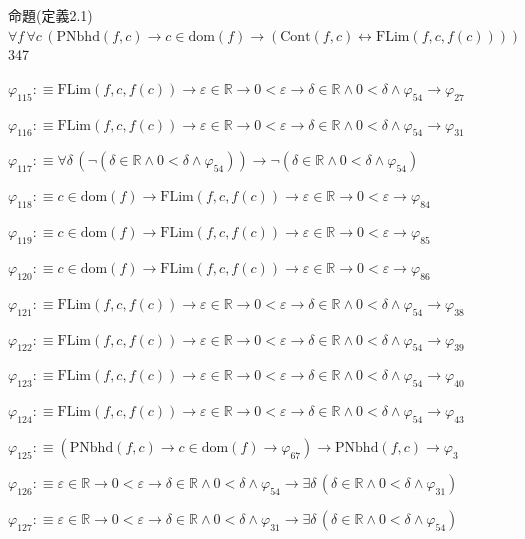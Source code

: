 \begin{fullproof}{命題(定義2.1)}{$\forall f\,\forall c\,(\mathrm{PNbhd}(f,c) \to c \in \mathrm{dom}(f) \to (\mathrm{Cont}(f,c) \leftrightarrow \mathrm{FLim}(f,c,f(c))))$}{347}
\begin{abbrevlist}
\item $\varphi_{115} :\equiv \mathrm{FLim}(f,c,f(c)) \to \varepsilon \in \mathbb{R} \to 0 < \varepsilon \to \delta \in \mathbb{R} \land 0 < \delta \land \varphi_{54} \to \varphi_{27}$
\item $\varphi_{116} :\equiv \mathrm{FLim}(f,c,f(c)) \to \varepsilon \in \mathbb{R} \to 0 < \varepsilon \to \delta \in \mathbb{R} \land 0 < \delta \land \varphi_{54} \to \varphi_{31}$
\item $\varphi_{117} :\equiv \forall \delta\,(\neg (\delta \in \mathbb{R} \land 0 < \delta \land \varphi_{54})) \to \neg (\delta \in \mathbb{R} \land 0 < \delta \land \varphi_{54})$
\item $\varphi_{118} :\equiv c \in \mathrm{dom}(f) \to \mathrm{FLim}(f,c,f(c)) \to \varepsilon \in \mathbb{R} \to 0 < \varepsilon \to \varphi_{84}$
\item $\varphi_{119} :\equiv c \in \mathrm{dom}(f) \to \mathrm{FLim}(f,c,f(c)) \to \varepsilon \in \mathbb{R} \to 0 < \varepsilon \to \varphi_{85}$
\item $\varphi_{120} :\equiv c \in \mathrm{dom}(f) \to \mathrm{FLim}(f,c,f(c)) \to \varepsilon \in \mathbb{R} \to 0 < \varepsilon \to \varphi_{86}$
\item $\varphi_{121} :\equiv \mathrm{FLim}(f,c,f(c)) \to \varepsilon \in \mathbb{R} \to 0 < \varepsilon \to \delta \in \mathbb{R} \land 0 < \delta \land \varphi_{54} \to \varphi_{38}$
\item $\varphi_{122} :\equiv \mathrm{FLim}(f,c,f(c)) \to \varepsilon \in \mathbb{R} \to 0 < \varepsilon \to \delta \in \mathbb{R} \land 0 < \delta \land \varphi_{54} \to \varphi_{39}$
\item $\varphi_{123} :\equiv \mathrm{FLim}(f,c,f(c)) \to \varepsilon \in \mathbb{R} \to 0 < \varepsilon \to \delta \in \mathbb{R} \land 0 < \delta \land \varphi_{54} \to \varphi_{40}$
\item $\varphi_{124} :\equiv \mathrm{FLim}(f,c,f(c)) \to \varepsilon \in \mathbb{R} \to 0 < \varepsilon \to \delta \in \mathbb{R} \land 0 < \delta \land \varphi_{54} \to \varphi_{43}$
\item $\varphi_{125} :\equiv (\mathrm{PNbhd}(f,c) \to c \in \mathrm{dom}(f) \to \varphi_{67}) \to \mathrm{PNbhd}(f,c) \to \varphi_{3}$
\item $\varphi_{126} :\equiv \varepsilon \in \mathbb{R} \to 0 < \varepsilon \to \delta \in \mathbb{R} \land 0 < \delta \land \varphi_{54} \to \exists \delta\,(\delta \in \mathbb{R} \land 0 < \delta \land \varphi_{31})$
\item $\varphi_{127} :\equiv \varepsilon \in \mathbb{R} \to 0 < \varepsilon \to \delta \in \mathbb{R} \land 0 < \delta \land \varphi_{31} \to \exists \delta\,(\delta \in \mathbb{R} \land 0 < \delta \land \varphi_{54})$

\end{abbrevlist}
\end{fullproof}
